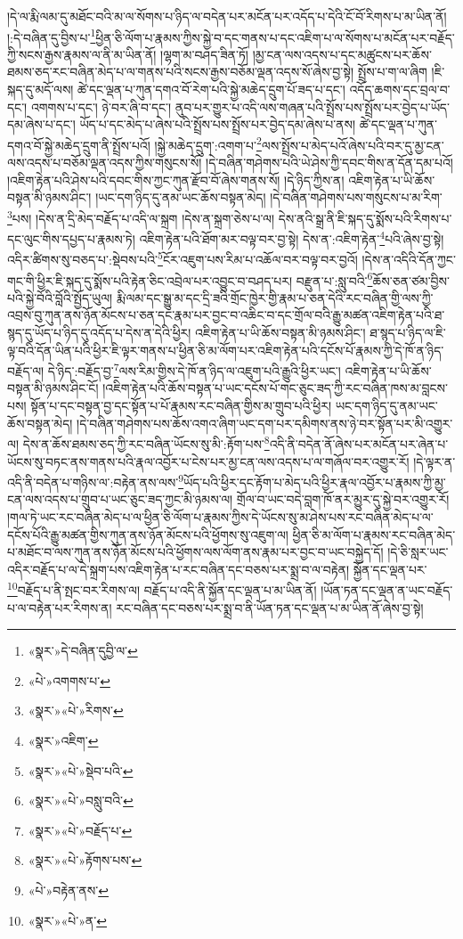 །དེ་ལ་རྨི་ལམ་དུ་མཐོང་བའི་མ་ལ་སོགས་པ་ཉིད་ལ་བདེན་པར་མངོན་པར་འདོད་པ་དེའི་ངོ་བོ་རིགས་པ་མ་ཡིན་ནོ། །:དེ་བཞིན་དུ་བྱིས་པ་\footnote{«སྣར་»དེ་བཞིན་དུབྱི་ལ་}ཕྱིན་ཅི་ལོག་པ་རྣམས་ཀྱིས་སྐྱེ་བ་དང་གནས་པ་དང་འཇིག་པ་ལ་སོགས་པ་མངོན་པར་བརྗོད་ཀྱི་སངས་རྒྱས་རྣམས་ལ་ནི་མ་ཡིན་ནོ། །ལྷག་མ་བཤད་ཟིན་ཏོ། །མྱ་ངན་ལས་འདས་པ་དང་མཚུངས་པར་ཆོས་ཐམས་ཅད་རང་བཞིན་མེད་པ་ལ་གནས་པའི་སངས་རྒྱས་བཅོམ་ལྡན་འདས་སོ་ཞེས་བྱ་སྟེ། སྤྲོས་པ་ག་ལ་ཞིག །ཇི་སྐད་དུ་མདོ་ལས། ཚེ་དང་ལྡན་པ་ཀུན་དགའ་བོ་རེག་པའི་སྐྱེ་མཆེད་དྲུག་པོ་ཟད་པ་དང་། འདོད་ཆགས་དང་བྲལ་བ་དང་། འགགས་པ་དང་། ཉེ་བར་ཞི་བ་དང་། ནུབ་པར་གྱུར་པ་འདི་ལས་གཞན་པའི་སྤྲོས་པས་སྤྲོས་པར་བྱེད་པ་ཡོད་དམ་ཞེས་པ་དང་། ཡོད་པ་དང་མེད་པ་ཞེས་པའི་སྤྲོས་པས་སྤྲོས་པར་བྱེད་དམ་ཞེས་པ་ནས། ཚེ་དང་ལྡན་པ་ཀུན་དགའ་བོ་སྐྱེ་མཆེད་དྲུག་ནི་སྤྲོས་པའོ། །སྐྱེ་མཆེད་དྲུག་:འགག་པ་\footnote{«པེ་»འགགས་པ་}ལས་སྤྲོས་པ་མེད་པའོ་ཞེས་པའི་བར་དུ་མྱ་ངན་ལས་འདས་པ་བཅོམ་ལྡན་འདས་ཀྱིས་གསུངས་སོ། །དེ་བཞིན་གཤེགས་པའི་ཡེ་ཤེས་ཀྱི་དབང་གིས་ན་དོན་དམ་པའོ། །འཇིག་རྟེན་པའི་ཤེས་པའི་དབང་གིས་ཀྱང་ཀུན་རྫོབ་བོ་ཞེས་གནས་སོ། །དེ་ཉིད་ཀྱིས་ན། འཇིག་རྟེན་པ་ཡི་ཆོས་བསྟན་མི་ཉམས་ཤིང་། །ཡང་དག་ཉིད་དུ་ནམ་ཡང་ཆོས་བསྟན་མེད། །དེ་བཞིན་གཤེགས་པས་གསུངས་པ་མ་རིག་\footnote{«སྣར་»«པེ་»རིགས་}པས། །དེས་ན་དྲི་མེད་བརྗོད་པ་འདི་ལ་སྐྲག །དེས་ན་སྐྲག་ཅེས་པ་ལ། དེས་ནའི་སྒྲ་ནི་ཇི་སྐད་དུ་སྨོས་པའི་རིགས་པ་དང་ལུང་གིས་དཔྱད་པ་རྣམས་ཏེ། འཇིག་རྟེན་པའི་ཐོག་མར་བལྟ་བར་བྱ་སྟེ། དེས་ན་:འཇིག་རྟེན་\footnote{«སྣར་»འཇིག་}པའི་ཞེས་བྱ་སྟེ། འདིར་ཚིགས་སུ་བཅད་པ་:སྡེབས་པའི་\footnote{«སྣར་»«པེ་»སྡེབ་པའི་}ངོར་འཇུག་པས་རིམ་པ་འཆོལ་བར་བལྟ་བར་བྱའོ། །དེས་ན་འདིའི་དོན་ཀྱང་གང་གི་ཕྱིར་ཇི་སྐད་དུ་སྨོས་པའི་རྟེན་ཅིང་འབྲེལ་པར་འབྱུང་བ་བཤད་པར། བརྫུན་པ་:སླུ་བའི་\footnote{«སྣར་»«པེ་»བསླུ་བའི་}ཆོས་ཅན་ཙམ་བྱིས་པའི་སྐྱེ་བོའི་བློའི་སྤྱོད་ཡུལ། རྨི་ལམ་དང་སྒྱུ་མ་དང་དྲི་ཟའི་གྲོང་ཁྱེར་གྱི་རྣམ་པ་ཅན་དེའི་རང་བཞིན་གྱི་ལས་ཀྱི་འབྲས་བུ་ཀུན་ནས་ཉོན་མོངས་པ་ཅན་དང་རྣམ་པར་བྱང་བ་འཆིང་བ་དང་གྲོལ་བའི་རྒྱུ་མཚན་འཇིག་རྟེན་པའི་ཐ་སྙད་དུ་ཡོད་པ་ཉིད་དུ་འདོད་པ་དེས་ན་དེའི་ཕྱིར། འཇིག་རྟེན་པ་ཡི་ཆོས་བསྟན་མི་ཉམས་ཤིང་། ཐ་སྙད་པ་ཉིད་ལ་ཇི་ལྟ་བའི་དོན་ཡིན་པའི་ཕྱིར་ཇི་ལྟར་གནས་པ་ཕྱིན་ཅི་མ་ལོག་པར་འཇིག་རྟེན་པའི་དངོས་པོ་རྣམས་ཀྱི་དེ་ཁོ་ན་ཉིད་བརྗོད་ལ། དེ་ཉིད་:བརྗོད་བྱ་\footnote{«སྣར་»«པེ་»བརྗོད་པ་}ལས་རིམ་གྱིས་དེ་ཁོ་ན་ཉིད་ལ་འཇུག་པའི་རྒྱུའི་ཕྱིར་ཡང་། འཇིག་རྟེན་པ་ཡི་ཆོས་བསྟན་མི་ཉམས་ཤིང་ངོ། །འཇིག་རྟེན་པའི་ཆོས་བསྟན་པ་ཡང་དངོས་པོ་གང་ཅུང་ཟད་ཀྱི་རང་བཞིན་ཁས་མ་བླངས་པས། སྟོན་པ་དང་བསྟན་བྱ་དང་སྟོན་པ་པོ་རྣམས་རང་བཞིན་གྱིས་མ་གྲུབ་པའི་ཕྱིར། ཡང་དག་ཉིད་དུ་ནམ་ཡང་ཆོས་བསྟན་མེད། །དེ་བཞིན་གཤེགས་པས་ཆོས་འགའ་ཞིག་ཡང་དག་པར་དམིགས་ནས་ཉེ་བར་སྟོན་པར་མི་འགྱུར་ལ། དེས་ན་ཆོས་ཐམས་ཅད་ཀྱི་རང་བཞིན་ཡོངས་སུ་མི་:རྟོག་པས་\footnote{«སྣར་»«པེ་»རྟོགས་པས་}འདི་ནི་བདེན་ནོ་ཞེས་པར་མངོན་པར་ཞེན་པ་ཡོངས་སུ་བཏང་ནས་གནས་པའི་རྣལ་འབྱོར་པ་ངེས་པར་མྱ་ངན་ལས་འདས་པ་ལ་གཞོལ་བར་འགྱུར་རོ། །དེ་ལྟར་ན་འདི་ནི་བདེན་པ་གཉིས་ལ་:བརྟེན་ནས་ལས་\footnote{«པེ་»བརྟེན་ནས་}ཡོད་པའི་ཕྱིར་དང་རྟོག་པ་མེད་པའི་ཕྱིར་རྣལ་འབྱོར་པ་རྣམས་ཀྱི་མྱ་ངན་ལས་འདས་པ་གྲུབ་པ་ཡང་ཅུང་ཟད་ཀྱང་མི་ཉམས་ལ། གྲོལ་བ་ཡང་བདེ་བླག་ཁོ་ནར་མྱུར་དུ་སྐྱེ་བར་འགྱུར་རོ། །གལ་ཏེ་ཡང་རང་བཞིན་མེད་པ་ལ་ཕྱིན་ཅི་ལོག་པ་རྣམས་ཀྱིས་དེ་ཡོངས་སུ་མ་ཤེས་པས་རང་བཞིན་མེད་པ་ལ་དངོས་པོའི་རྒྱུ་མཚན་གྱིས་ཀུན་ནས་ཉོན་མོངས་པའི་ཕྱོགས་སུ་འཇུག་ལ། ཕྱིན་ཅི་མ་ལོག་པ་རྣམས་རང་བཞིན་མེད་པ་མཐོང་བ་ལས་ཀུན་ནས་ཉོན་མོངས་པའི་ཕྱོགས་ལས་ལོག་ནས་རྣམ་པར་བྱང་བ་ཡང་བསྐྱེད་དོ། །དེ་ཅི་སླར་ཡང་འདིར་བརྗོད་པ་ལ་དེ་སྐྲག་པས་འཇིག་རྟེན་པ་རང་བཞིན་དང་བཅས་པར་སྨྲ་བ་ལ་བརྟེན། སྐྱོན་དང་ལྡན་པར་\footnote{«སྣར་»«པེ་»ན་}བརྗོད་པ་ནི་སྤང་བར་རིགས་ལ། བརྗོད་པ་འདི་ནི་སྐྱོན་དང་ལྡན་པ་མ་ཡིན་ནོ། །ཡོན་ཏན་དང་ལྡན་ན་ཡང་བརྗོད་པ་ལ་བརྟེན་པར་རིགས་ན། རང་བཞིན་དང་བཅས་པར་སྨྲ་བ་ནི་ཡོན་ཏན་དང་ལྡན་པ་མ་ཡིན་ནོ་ཞེས་བྱ་སྟེ། 